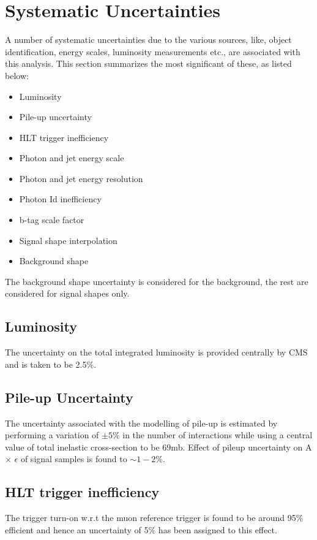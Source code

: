 \section{Systematic Uncertainties}
A number of systematic uncertainties due to the various sources, like, object identification, energy scales, luminosity measurements
etc., are associated with this analysis. This section summarizes the most significant of these, as listed below:
\vspace{-0.1in}
\begin{itemize}[leftmargin=*]
  \setlength{\itemsep}{1pt}
\item Luminosity
\item Pile-up uncertainty
\item HLT trigger inefficiency
\item Photon and jet energy scale
\item Photon and jet energy resolution 
\item Photon Id inefficiency
\item b-tag scale factor
\item Signal shape interpolation
\item Background shape
\end{itemize}
The background shape uncertainty is considered for the background, the rest are considered for signal shapes only.
\subsection{Luminosity}
The uncertainty on the total integrated luminosity is provided centrally by CMS and is taken to be 2.5$\%$.
\subsection{Pile-up Uncertainty }
The uncertainty associated with the modelling of pile-up is estimated by performing a variation of $\pm5\%$ in the number of interactions
while using a central value of total inelastic cross-section to be 69\unit{mb}. Effect of pileup uncertainty
on A $\times$ $\epsilon$ of signal samples is found to $\sim 1-2\%$.
\subsection{HLT trigger inefficiency}
The trigger turn-on w.r.t the muon reference trigger is found to be around 95$\%$ efficient and hence an uncertainty of 5$\%$ has been assigned to this effect. 
